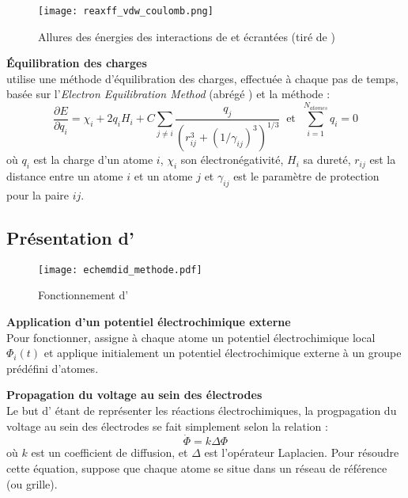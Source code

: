 \begin{figure}[h!]
    \centering
    \texttt{[image: reaxff\_vdw\_coulomb.png]}
    \caption{Allures des énergies des interactions de \vdw{} et \coulomb{} écrantées {\tiny (tiré de \cite{russo_atomistic-scale_2011})}}
    \label{fig:reaxff_vdw_coulomb}
\end{figure}

\textbf{Équilibration des charges}\\
\reaxff{} utilise une méthode d'équilibration des charges, effectuée à chaque pas de temps, basée sur l'\emph{Electron Equilibration Method} (abrégé \eem{})\cite{mortier_electronegativity-equalization_2002} et la méthode \qeq{}\cite{rappe_charge_1991} :
\begin{equation}
    \boxed%
    {
    \frac{\partial E}{\partial q_i} = \chi_i + 2 q_i H_i + C \sum_{j \neq i} \frac{q_j}{\left(r_{ij}^3 + (1 / \gamma_{ij})^3\right)^{1/3}}
    }
    \ \text{ et } \ 
    \boxed%
    {
        \sum_{i = 1}^{N_{atomes}} q_i = 0
    }
\end{equation}
où $q_i$ est la charge d'un atome $i$, $\chi_i$ son électronégativité, $H_i$ sa dureté, $r_{ij}$ est la distance entre un atome $i$ et un atome $j$ et $\gamma_{ij}$ est le paramètre de protection pour la paire $ij$.


    \subsection{Présentation d'\echemdid{}} \label{sec:echemdid}

\begin{figure}[h!]
    \centering
    \texttt{[image: echemdid\_methode.pdf]}
    \caption{Fonctionnement d'\echemdid{}}
    \label{fig:echemdid_fonctionnement}
\end{figure}

\textbf{Application d'un potentiel électrochimique externe}\\
Pour fonctionner, \echemdid{} assigne à chaque atome un potentiel électrochimique local $\Phi_i (t)$ et applique initialement un potentiel électrochimique externe à un groupe prédéfini d'atomes.

\textbf{Propagation du voltage au sein des électrodes}\\
Le but d'\echemdid{} étant de représenter les réactions électrochimiques, la progpagation du voltage au sein des électrodes se fait simplement selon la relation :
\begin{equation}
    \dot{\Phi} = k \Delta \Phi
    \label{eq:echemdid_propagation}
\end{equation}
où $k$ est un coefficient de diffusion, et $\Delta$ est l'opérateur Laplacien. Pour résoudre cette équation, \echemdid{} suppose que chaque atome se situe dans un réseau de référence (ou grille).

